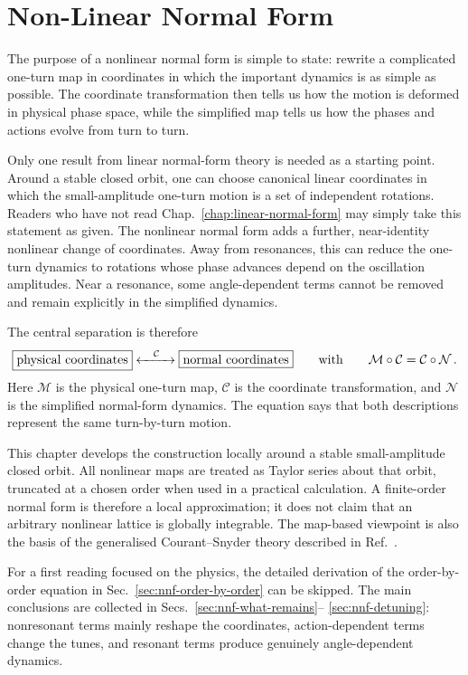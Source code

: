 \chapter{Non-Linear Normal Form}\label{chap:nonlinear-normal-form}

The purpose of a nonlinear normal form is simple to state: rewrite a
complicated one-turn map in coordinates in which the important dynamics is
as simple as possible.  The coordinate transformation then tells us how the
motion is deformed in physical phase space, while the simplified map tells us
how the phases and actions evolve from turn to turn.

Only one result from linear normal-form theory is needed as a starting point.
Around a stable closed orbit, one can choose canonical linear coordinates in
which the small-amplitude one-turn motion is a set of independent rotations.
Readers who have not read Chap.~\ref{chap:linear-normal-form} may simply take
this statement as given.  The nonlinear normal form adds a further,
near-identity nonlinear change of coordinates.  Away from resonances, this
can reduce the one-turn dynamics to rotations whose phase advances depend on
the oscillation amplitudes.  Near a resonance, some angle-dependent terms
cannot be removed and remain explicitly in the simplified dynamics.

The central separation is therefore
\begin{equation}\label{eq:nnf-basic-picture}
    \boxed{\text{physical coordinates}}
    \xleftrightarrow{\quad\mathcal C\quad}
    \boxed{\text{normal coordinates}}
    \qquad\text{with}\qquad
    \mathcal M\circ\mathcal C = \mathcal C\circ\mathcal N\,.
\end{equation}
Here $\mathcal M$ is the physical one-turn map, $\mathcal C$ is the coordinate
transformation, and $\mathcal N$ is the simplified normal-form dynamics.  The
equation says that both descriptions represent the same turn-by-turn motion.

This chapter develops the construction locally around a stable
small-amplitude closed orbit.  All nonlinear maps are treated as Taylor
series about that orbit, truncated at a chosen order when used in a practical
calculation.  A finite-order normal form is therefore a local approximation;
it does not claim that an arbitrary nonlinear lattice is globally integrable.
The map-based viewpoint is also the basis of the generalised
Courant--Snyder theory described in Ref.~\cite{Forest_book2}.

For a first reading focused on the physics, the detailed derivation of the
order-by-order equation in Sec.~\ref{sec:nnf-order-by-order} can be skipped.
The main conclusions are collected in Secs.~\ref{sec:nnf-what-remains}--
\ref{sec:nnf-detuning}: nonresonant terms mainly reshape the coordinates,
action-dependent terms change the tunes, and resonant terms produce genuinely
angle-dependent dynamics.



